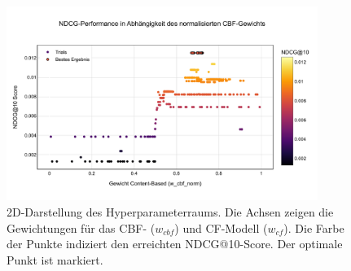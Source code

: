 
\begin{figure}[htbp]
    \centering
    \includegraphics[width=0.9\textwidth]{content/figures/svg/2d_performance.pdf}
    \caption{2D-Darstellung des Hyperparameterraums. Die Achsen zeigen die Gewichtungen für das CBF- (\(w_{cbf}\)) und CF-Modell (\(w_{cf}\)). Die Farbe der Punkte indiziert den erreichten NDCG@10-Score. Der optimale Punkt ist markiert.}
    \label{fig:2d_performance}
\end{figure}
